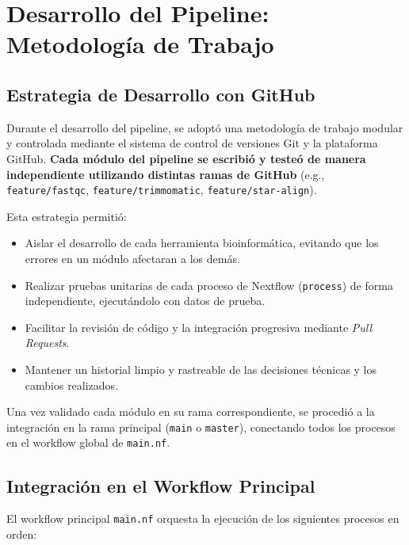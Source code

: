 \documentclass[11pt,a4paper]{article}
\begin{document}
\section{Desarrollo del Pipeline: Metodología de Trabajo}
\label{sec:desarrollo}

\subsection{Estrategia de Desarrollo con GitHub}

Durante el desarrollo del pipeline, se adoptó una metodología de trabajo modular y controlada mediante el sistema de control de versiones Git y la plataforma GitHub. \textbf{Cada módulo del pipeline se escribió y testeó de manera independiente utilizando distintas ramas de GitHub} (e.g., \texttt{feature/fastqc}, \texttt{feature/trimmomatic}, \texttt{feature/star-align}).

Esta estrategia permitió:
\begin{itemize}
    \item Aislar el desarrollo de cada herramienta bioinformática, evitando que los errores en un módulo afectaran a los demás.
    \item Realizar pruebas unitarias de cada proceso de Nextflow (\texttt{process}) de forma independiente, ejecutándolo con datos de prueba.
    \item Facilitar la revisión de código y la integración progresiva mediante \textit{Pull Requests}.
    \item Mantener un historial limpio y rastreable de las decisiones técnicas y los cambios realizados.
\end{itemize}

Una vez validado cada módulo en su rama correspondiente, se procedió a la integración en la rama principal (\texttt{main} o \texttt{master}), conectando todos los procesos en el workflow global de \texttt{main.nf}.

\subsection{Integración en el Workflow Principal}

El workflow principal \texttt{main.nf} orquesta la ejecución de los siguientes procesos en orden:
\end{document}
